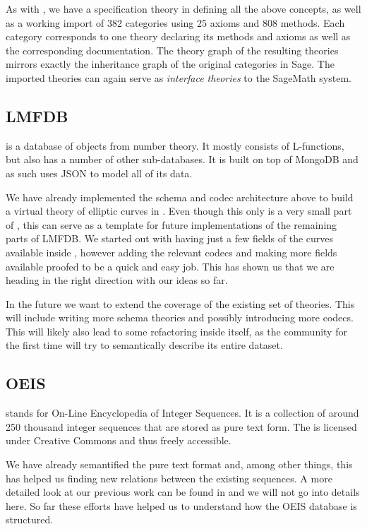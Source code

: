 As with \GAP, we have a specification theory in \MMT defining all the above concepts, as well as a working import of 382 categories using 25 axioms and 808 methods. Each category corresponds to one \MMT theory declaring its methods and axioms as well as the corresponding documentation. The theory graph of the resulting theories mirrors exactly the inheritance graph of the original categories in Sage. The imported theories can again serve as \emph{interface theories} to the SageMath system.

\subsection{LMFDB}\label{sec:lmfdb}

\LMFDB \cite{lmfdb} is a database of objects from number theory. It mostly consists of
L-functions, but also has a number of other sub-databases. It is built on top of MongoDB
and as such uses JSON to model all of its data.

We have already implemented the schema and codec architecture above to build a virtual
theory of elliptic curves in \LMFDB. Even though this only is a very small part of \LMFDB,
this can serve as a template for future implementations of the remaining parts of
LMFDB. We started out with having just a few fields of the curves available inside \MMT,
however adding the relevant codecs and making more fields available proofed to be a quick
and easy job. This has shown us that we are heading in the right direction with our ideas
so far.

In the future we want to extend the coverage of the existing set of theories. This will
include writing more schema theories and possibly introducing more codecs. This will
likely also lead to some refactoring inside \LMFDB itself, as the community for the first
time will try to semantically describe its entire dataset.

\subsection{OEIS}

\OEIS \cite{oeis} stands for On-Line Encyclopedia of Integer Sequences. It is a collection
of around 250 thousand integer sequences that are stored as pure text form. The \OEIS is
licensed under Creative Commons and thus freely accessible.

We have already semantified the pure text format and, among other things, this has helped
us finding new relations between the existing sequences. A more detailed look at our
previous work can be found in \cite{LuzKoh:fsarfo16} and we will not go into details
here. So far these efforts have helped us to understand how the OEIS database is
structured.


